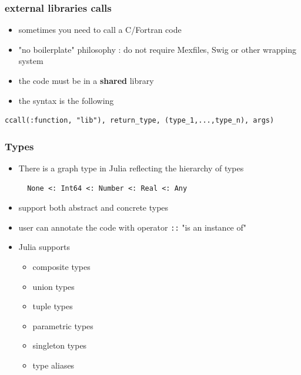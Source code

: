 \documentclass[11pt,mathserif]{beamer}
\newcommand{\julia}{{ Julia}{} }
\begin{document}
\begin{frame}[fragile]
\frametitle{external libraries calls}
\pause
\begin{itemize}[<+->]
    \item sometimes you need to call a C/Fortran code
    \item "no boilerplate" philosophy : do not require { Mexfiles}, Swig or other wrapping system
    \item the code must be in a {\bf shared} library 
    \item the syntax is the following  
\end{itemize}
\pause
\begin{lstlisting}
ccall(:function, "lib"), return_type, (type_1,...,type_n), args)
\end{lstlisting}
\end{frame}


\begin{frame}[fragile]
\frametitle{Types}
\pause
\begin{itemize}[<+->]
    \item There is a graph type in Julia reflecting the hierarchy of types
\begin{lstlisting}
  None <: Int64 <: Number <: Real <: Any
\end{lstlisting}
    \item support both abstract and concrete types
    \item user can annotate the code with operator \texttt{::} "is an instance of"
    \item \julia supports 
    \begin{itemize}
        \item composite types 
        \item union types  
        \item tuple types  
        \item parametric types  
        \item singleton types
        \item type aliases
    \end{itemize}  
\end{itemize}
\end{frame}
\end{document}
